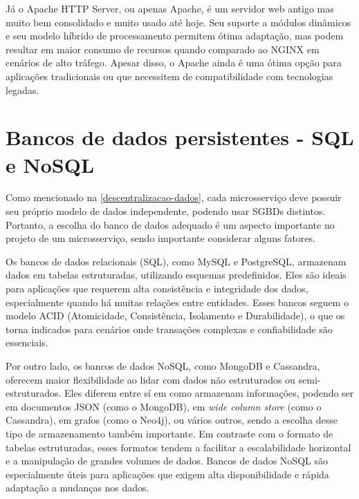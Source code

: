 Já o Apache HTTP Server, ou apenas Apache, é um servidor web antigo mas muito bem consolidado e muito usado até hoje. Seu suporte a módulos dinâmicos e seu modelo híbrido de processamento permitem ótima adaptação, mas podem resultar em maior consumo de recursos quando comparado ao NGINX em cenários de alto tráfego. Apesar disso, o Apache ainda é uma ótima opção para aplicações tradicionais ou que necessitem de compatibilidade com tecnologias legadas. \cite{nginx-vs-apache}


\section{Bancos de dados persistentes - SQL e NoSQL}
Como mencionado na \autoref{descentralizacao-dados}, cada microsserviço deve possuir seu próprio modelo de dados independente, podendo usar SGBDs distintos. Portanto, a escolha do banco de dados adequado é um aspecto importante no projeto de um microsserviço, sendo importante considerar alguns fatores.

Os bancos de dados relacionais (SQL), como MySQL e PostgreSQL, armazenam dados em tabelas estruturadas, utilizando esquemas predefinidos. Eles são ideais para aplicações que requerem alta consistência e integridade dos dados, especialmente quando há muitas relações entre entidades. Esses bancos seguem o modelo ACID (Atomicidade, Consistência, Isolamento e Durabilidade), o que os torna indicados para cenários onde transações complexas e confiabilidade são essenciais. \cite{mongodb-sql-nosql}

Por outro lado, os bancos de dados NoSQL, como MongoDB e Cassandra, oferecem maior flexibilidade ao lidar com dados não estruturados ou semi-estruturados. Eles diferem entre sí em como armazenam informações, podendo ser em documentos JSON (como o MongoDB), em \emph{wide column store} (como o Cassandra), em grafos (como o Neo4j), ou vários outros, sendo a escolha desse tipo de armazenamento também importante. Em contraste com o formato de tabelas estruturadas, esses formatos tendem a facilitar a escalabilidade horizontal e a manipulação de grandes volumes de dados. Bancos de dados NoSQL são especialmente úteis para aplicações que exigem alta disponibilidade e rápida adaptação a mudanças nos dados. \cite{mongodb-sql-nosql}

